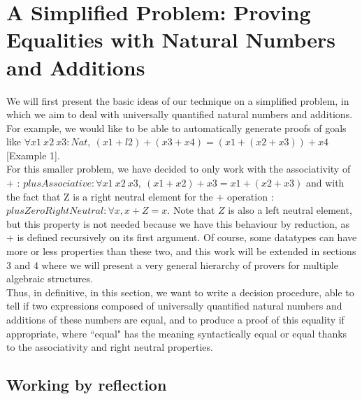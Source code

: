 \section{A Simplified Problem: Proving Equalities with Natural Numbers and Additions}

\label{sect:ideas}

We will first present the basic ideas of our technique on a simplified problem, in which we aim to deal with universally quantified natural numbers and additions.
For example, we would like to be able to automatically generate proofs of goals like $\forall x1\ x2\ x3:Nat,\ (x1 + l2) + (x3 + x4) = (x1 + (x2 + x3)) + x4$ [Example 1]. \\
For this smaller problem, we have decided to only work with the associativity of $+$ : $plusAssociative : \forall x1\ x2\ x3,\ (x1 + x2) + x3 = x1 + (x2 + x3)$ and with the fact that Z is a right neutral element for the $+$ operation : $plusZeroRightNeutral : \forall x, x + Z = x$. Note that $Z$ is also a left neutral element, but this property is not needed because we have this behaviour by reduction, as $+$ is defined recursively on its first argument. Of course, some datatypes can have more or less properties than these two, and this work will be extended in sections 3 and 4 where we will present a very general hierarchy of provers for multiple algebraic structures. \\
Thus, in definitive, in this section, we want to write a decision procedure, able to tell if two expressions composed of universally quantified natural numbers and additions of these numbers are equal, and to produce a proof of this equality if appropriate, where ``equal" has the meaning syntactically equal or equal thanks to the associativity and right neutral properties.


\subsection{Working by reflection}

